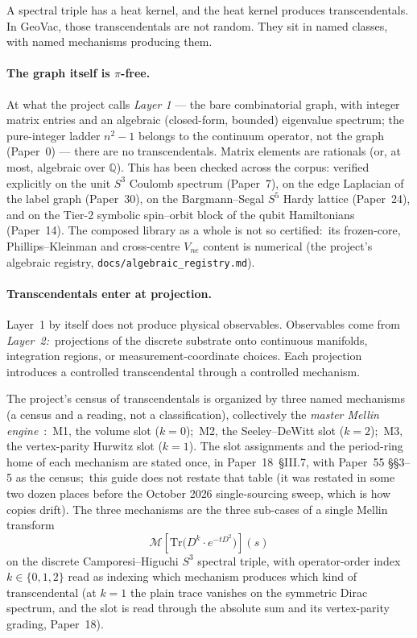 \documentclass[11pt,a4paper]{article}
\newcommand{\sthree}{S^{3}}
\newcommand{\sfive}{S^{5}}
\newcommand{\Q}{\mathbb{Q}}
\newcommand{\Tr}{\mathrm{Tr}}
\begin{document}
A spectral triple has a heat kernel, and the heat kernel produces
transcendentals.  In GeoVac, those transcendentals are not random.
They sit in named classes, with named mechanisms producing them.

\paragraph{The graph itself is $\pi$-free.}
At what the project calls \emph{Layer 1} --- the bare combinatorial
graph, with integer matrix entries and an algebraic (closed-form,
bounded) eigenvalue spectrum; the pure-integer ladder $n^2-1$ belongs to
the continuum operator, not the graph (Paper~0) --- there are no
transcendentals.  Matrix elements are rationals (or, at most,
algebraic over $\Q$).  This has been checked across the corpus:
verified explicitly on the unit $\sthree$ Coulomb spectrum (Paper~7),
on the edge Laplacian of the label graph (Paper~30), on the Bargmann--Segal
$\sfive$ Hardy lattice (Paper~24), and on the Tier-2 symbolic spin--orbit
block of the qubit Hamiltonians (Paper~14).  The composed library as a whole
is not so certified:\ its frozen-core, Phillips--Kleinman and cross-centre
$V_{ne}$ content is numerical (the project's algebraic registry,
\texttt{docs/algebraic\_registry.md}).

\paragraph{Transcendentals enter at projection.}
Layer~1 by itself does not produce physical observables.  Observables
come from \emph{Layer~2:}\ projections of the discrete substrate onto
continuous manifolds, integration regions, or measurement-coordinate
choices.  Each projection introduces a controlled transcendental
through a controlled mechanism.

The project's census of transcendentals is organized by three named
mechanisms (a census and a reading, not a classification),
collectively the \emph{master Mellin engine}~\cite{loutey_paper18,
loutey_paper32, loutey_paper55}:\ M1, the volume slot ($k = 0$);\ M2,
the Seeley--DeWitt slot ($k = 2$);\ M3, the vertex-parity Hurwitz slot
($k = 1$).  The slot assignments and the period-ring home of each
mechanism are stated once, in Paper~18~\S III.7, with Paper~55 \S\S 3--5
as the census;\ this guide does not restate that table (it was
restated in some two dozen places before the October 2026
single-sourcing sweep, which is how copies drift).  The three
mechanisms are the three sub-cases of a single Mellin transform
\begin{equation}
\label{eq:master_mellin}
\mathcal{M}\!\left[\Tr\bigl(D^k \cdot e^{-tD^2}\bigr)\right](s)
\end{equation}
on the discrete Camporesi--Higuchi $\sthree$ spectral triple, with
operator-order index $k \in \{0, 1, 2\}$ read as indexing which
mechanism produces which kind of transcendental (at $k = 1$ the plain
trace vanishes on the symmetric Dirac spectrum, and the slot is read
through the absolute sum and its vertex-parity grading, Paper~18).
\end{document}
